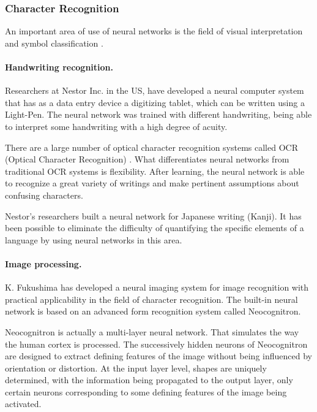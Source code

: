 \subsubsection{Character Recognition}

An important area of use of neural networks is the field of visual interpretation and symbol classification \cite{Bishop}.

\paragraph{Handwriting recognition.} Researchers at Nestor Inc. in the US, have developed a neural computer system that has as a data entry device a digitizing tablet, which can be written using a Light-Pen. The neural network was trained with different handwriting, being able to interpret some handwriting with a high degree of acuity.

There are a large number of optical character recognition systems called OCR (Optical Character Recognition) \cite{oecd}. What differentiates neural networks from traditional OCR systems is flexibility. After learning, the neural network is able to recognize a great variety of writings and make pertinent assumptions about confusing characters.

Nestor's researchers built a neural network for Japanese writing (Kanji). It has been possible to eliminate the difficulty of quantifying the specific elements of a language by using neural networks in this area.

\paragraph{Image processing.} K. Fukushima \cite{Fukushima1,Fukushima2} has developed a neural imaging system for image recognition with practical applicability in the field of character recognition. The built-in neural network is based on an advanced form recognition system called Neocognitron.

Neocognitron is actually a multi-layer neural network. That simulates the way the human cortex is processed. The successively hidden neurons of Neocognitron are designed to extract defining features of the image without being influenced by orientation or distortion. At the input layer level, shapes are uniquely determined, with the information being propagated to the output layer, only certain neurons corresponding to some defining features of the image being activated.

